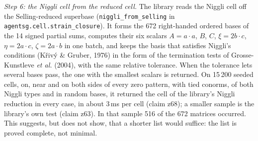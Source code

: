 \documentclass[preprint,pdf]{iucr}          %
\begin{document}
\emph{Step 6: the Niggli cell from the reduced cell.} The library reads the Niggli cell off the Selling-reduced superbase (\texttt{niggli\_from\_selling} in \texttt{agentsg.cell.strain\_closure}). It forms the 672 right-handed ordered bases of the 14 signed partial sums, computes their six scalars $A=a\cdot a$, $B$, $C$, $\xi=2b\cdot c$, $\eta=2a\cdot c$, $\zeta=2a\cdot b$ in one batch, and keeps the basis that satisfies Niggli's conditions (K\v{r}iv\'y \& Gruber, 1976) in the form of the termination tests of Grosse-Kunstleve \emph{et al.} (2004), with the same relative tolerance. When the tolerance lets several bases pass, the one with the smallest scalars is returned. On 15\,200 seeded cells, on, near and on both sides of every zero pattern, with tied conorms, of both Niggli types and in random bases, it returned the cell of the library's Niggli reduction in every case, in about 3\,ms per cell (claim z68); a smaller sample is the library's own test (claim z63). In that sample 516 of the 672 matrices occurred. This suggests, but does not show, that a shorter list would suffice: the list is proved complete, not minimal.
\end{document}
